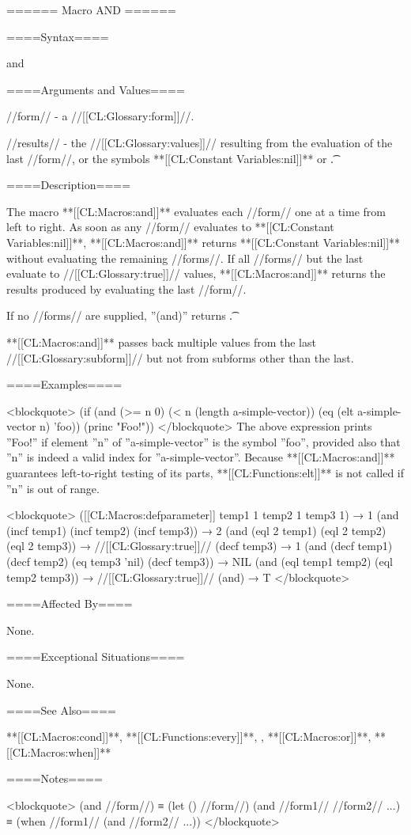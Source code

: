 ====== Macro AND ======

====Syntax====

\DefmacWithValues and {} {}

====Arguments and Values====

//form// - a //[[CL:Glossary:form]]//.

//results// - the //[[CL:Glossary:values]]// resulting from the evaluation of the last //form//, or the symbols **[[CL:Constant Variables:nil]]** or \t.

====Description====

The macro **[[CL:Macros:and]]** evaluates each //form// one at a time from left to right. As soon as any //form// evaluates to **[[CL:Constant Variables:nil]]**, **[[CL:Macros:and]]** returns **[[CL:Constant Variables:nil]]** without evaluating the remaining //forms//. If all //forms// but the last evaluate to //[[CL:Glossary:true]]// values, **[[CL:Macros:and]]** returns the results produced by evaluating the last //form//.

If no //forms// are supplied, ''(and)'' returns \t.

**[[CL:Macros:and]]** passes back multiple values from the last //[[CL:Glossary:subform]]// but not from subforms other than the last.

====Examples====

<blockquote> (if (and (>= n 0) (< n (length a-simple-vector)) (eq (elt a-simple-vector n) 'foo)) (princ "Foo!")) </blockquote> The above expression prints ''Foo!'' if element ''n'' of ''a-simple-vector'' is the symbol ''foo'', provided also that ''n'' is indeed a valid index for ''a-simple-vector''. Because **[[CL:Macros:and]]** guarantees left-to-right testing of its parts, **[[CL:Functions:elt]]** is not called if ''n'' is out of range.

<blockquote> ([[CL:Macros:defparameter]] temp1 1 temp2 1 temp3 1) → 1 (and (incf temp1) (incf temp2) (incf temp3)) → 2 (and (eql 2 temp1) (eql 2 temp2) (eql 2 temp3)) → //[[CL:Glossary:true]]// (decf temp3) → 1 (and (decf temp1) (decf temp2) (eq temp3 'nil) (decf temp3)) → NIL (and (eql temp1 temp2) (eql temp2 temp3)) → //[[CL:Glossary:true]]// (and) → T </blockquote>

====Affected By====

None.

====Exceptional Situations====

None.

====See Also====

**[[CL:Macros:cond]]**, **[[CL:Functions:every]]**, , **[[CL:Macros:or]]**, **[[CL:Macros:when]]**

====Notes====

<blockquote> (and //form//) ≡ (let () //form//) (and //form1// //form2// ...) ≡ (when //form1// (and //form2// ...)) </blockquote>

